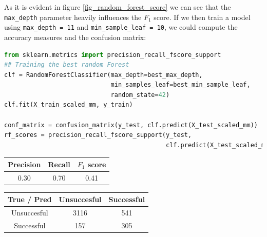 As it is evident in figure \ref{fig_random_forest_score} we can see that the \texttt{max\_depth} parameter heavily influences the \(F_1\) score. If we then train a model using \texttt{max\_depth = 11} and \texttt{min\_sample\_leaf = 10}, we could compute the accuracy measures and the confusion matrix:

\begin{lstlisting}[language=Python, caption= Deploying the Random forest with the best parameters]
from sklearn.metrics import precision_recall_fscore_support
## Training the best random Forest
clf = RandomForestClassifier(max_depth=best_max_depth,
                             min_samples_leaf=best_min_sample_leaf, 
                             random_state=42)
clf.fit(X_train_scaled_mm, y_train)

conf_matrix = confusion_matrix(y_test, clf.predict(X_test_scaled_mm))
rf_scores = precision_recall_fscore_support(y_test,
                                            clf.predict(X_test_scaled_mm))
\end{lstlisting}
\begin{center}
    \begin{tabular}{|c|c|c|}
        \hline
        Precision & Recall & \(F_1\) score \\
        \hline
        0.30 & 0.70 & 0.41 \\
        \hline
    \end{tabular}
    \quad     
    \begin{tabular}{|c|c|c|}
        \hline
         True / Pred & Unsuccesful & Successful \\
        \hline
        Unsuccesful & 3116 & 541 \\
        \hline
        Successful & 157 & 305\\
        \hline
    \end{tabular}
\end{center}
